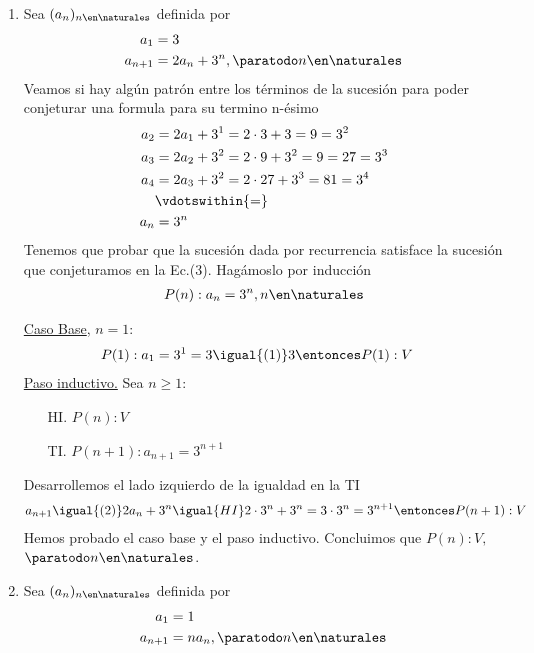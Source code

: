 \begin{enumerate}[label=\roman*)]
  \item Sea $(a_n)_{n \en \naturales }$ definida por
        \setcounter{equation}{0}
        \begin{align}
          a_1     & = 3                                       \\
          a_{n+1} & = 2 a_n + 3^n, \paratodo n \en \naturales
        \end{align}
        Veamos si hay algún patrón entre los términos de la sucesión para poder conjeturar una formula para su termino
        n-ésimo
        \begin{align*}
          a_2 & = 2 a_1 + 3^1 = 2 \cdot 3 + 3 = 9 = 3^2         \\
          a_3 & = 2 a_2 + 3^2 = 2 \cdot 9 + 3^2 = 9  = 27 = 3^3 \\
          a_4 & = 2 a_3 + 3^2 = 2 \cdot 27 + 3^3  = 81 = 3^4    \\
              & \vdotswithin{=}                                 \\
          a_n & = 3^n
        \end{align*}
        Tenemos que probar que la sucesión dada por recurrencia satisface la sucesión que conjeturamos en la Ec.(3).
        Hagámoslo por inducción
        \begin{align*}
          P(n): a_n = 3^n,  n \en \naturales
        \end{align*}

        \underline{Caso Base}, $n = 1$:
        \begin{align*}
           & P(1): a_1 = 3^1 = 3 \igual{(1)} 3 \entonces P(1):V
        \end{align*}
        \underline{Paso inductivo.} Sea $n \geq 1$:
        \begin{enumerate}
          \item[HI.] $P(n): V$
          \item[TI.] $P(n+1): a_{n+1} = 3^{n+1}$
        \end{enumerate}
        Desarrollemos el lado izquierdo de la igualdad en la TI
        \begin{align*}
          a_{n+1} \igual{(2)} 2 a_n + 3^n \igual{HI} 2 \cdot 3^n + 3^n = 3 \cdot 3^n = 3^{n+1}
          \entonces P(n+1):V
        \end{align*}
        Hemos probado el caso base y el paso inductivo. Concluimos que $P(n):V,$ $\paratodo n \en \naturales $.

  \item Sea $(a_n)_{n \en \naturales }$ definida por
        \setcounter{equation}{0}
        \begin{align}
          a_1     & = 1                                 \\
          a_{n+1} & = n a_n, \paratodo n \en \naturales
        \end{align}


\end{enumerate}
